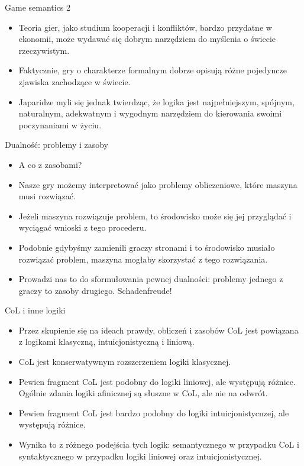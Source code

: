 \documentclass{beamer}
\begin{document}
\begin{frame}{Game semantics 2}
\begin{itemize}
	\item Teoria gier, jako studium kooperacji i konfliktów, bardzo przydatne w ekonomii, może wydawać się dobrym narzędziem do myślenia o świecie rzeczywistym.
	\item Faktycznie, gry o charakterze formalnym dobrze opisują różne pojedyncze zjawiska zachodzące w świecie.
	\item Japaridze myli się jednak twierdząc, że logika jest najpełniejszym, spójnym, naturalnym, adekwatnym i wygodnym narzędziem do kierowania swoimi poczynaniami w życiu.
\end{itemize}
\end{frame}

\begin{frame}{Dualność: problemy i zasoby}
\begin{itemize}
	\item A co z zasobami?
	\item Nasze gry możemy interpretować jako problemy obliczeniowe, które maszyna musi rozwiązać.
	\item Jeżeli maszyna rozwiązuje problem, to środowisko może się jej przyglądać i wyciągać wnioski z tego procederu.
	\item Podobnie gdybyśmy zamienili graczy stronami i to środowisko musiało rozwiązać problem, maszyna mogłaby skorzystać z tego rozwiązania.
	\item Prowadzi nas to do sformułowania pewnej dualności: problemy jednego z graczy to zasoby drugiego. Schadenfreude!
\end{itemize}
\end{frame}

\begin{frame}{CoL i inne logiki}
\begin{itemize}
	\item Przez skupienie się na ideach prawdy, obliczeń i zasobów CoL jest powiązana z logikami klasyczną, intuicjonistyczną i liniową.
	\item CoL jest konserwatywnym rozszerzeniem logiki klasycznej.
	\item Pewien fragment CoL jest podobny do logiki liniowej, ale występują różnice. Ogólnie zdania logiki afinicznej są słuszne w CoL, ale nie na odwrót.
	\item Pewien fragment CoL jest bardzo podobny do logiki intuicjonistycnzej, ale występują różnice.
	\item Wynika to z różnego podejścia tych logik: semantycznego w przypadku CoL i syntaktycznego w przypadku logiki liniowej oraz intuicjonistycznej.
\end{itemize}
\end{frame}
\end{document}
